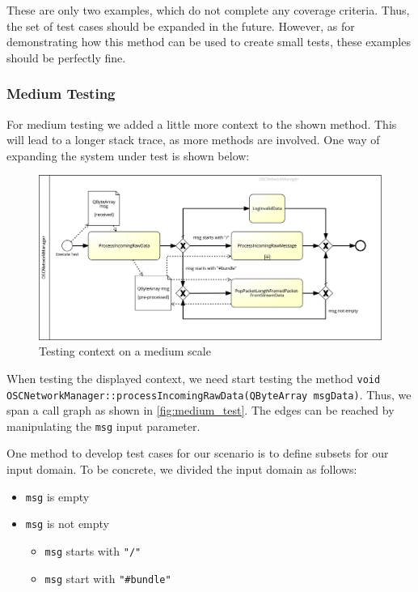 \documentclass{scrreprt}
\begin{document}
These are only two examples, which do not complete any coverage criteria. Thus, the set of test cases should be expanded in the future. However, as for demonstrating how this method can be used to create small tests, these examples should be perfectly fine.

\subsubsection{Medium Testing}

For medium testing we added a little more context to the shown method. This will lead to a longer stack trace, as more methods are involved. One way of expanding the system under test is shown below:

\begin{figure}[h]
	\centering
	\includegraphics[width=1.1\textwidth]{img/2_1_3_medium_test}
	\caption[Medium Testing Context]{Testing context on a medium scale}
	\label{fig:medium_test}
\end{figure}


When testing the displayed context, we need start testing the method \texttt{void OSCNetworkManager::processIncomingRawData(QByteArray msgData)}. Thus, we span a call graph as shown in \vref{fig:medium_test}. The edges can be reached by manipulating the \texttt{msg} input parameter.

One method to develop test cases for our scenario is to define subsets for our input domain. To be concrete, we divided the input domain as follows:

\begin{itemize}
	\item \texttt{msg} is empty
	\item \texttt{msg} is not empty
	
	\begin{itemize}
		\item \texttt{msg} starts with \texttt{"/"}
		\item \texttt{msg} start with \texttt{"\#bundle"}
	\end{itemize}
\end{itemize}
\end{document}
